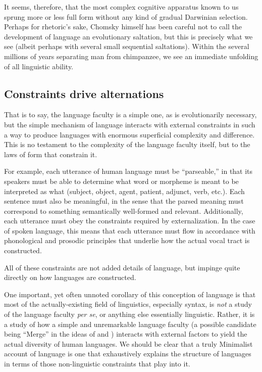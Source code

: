 \documentclass{article}
\begin{document}
It seems, therefore, that the most complex cognitive apparatus known to us sprung more or less full form without any kind of gradual Darwinian selection. Perhaps for rhetoric's sake, Chomsky himself has been careful not to call the development of language an evolutionary saltation, but this is precisely what we see (albeit perhaps with several small sequential saltations). Within the several millions of years separating man from chimpanzee, we see an immediate unfolding of all linguistic ability.

\subsection{Constraints drive alternations}

That is to say, the language faculty is a simple one, as is evolutionarily necessary, but the simple mechanism of language interacts with external constraints in such a way to produce languages with enormous superficial complexity and difference. This is no testament to the complexity of the language faculty itself, but to the laws of form that constrain it.

For example, each utterance of human language must be ``parseable,'' in that its speakers must be able to determine what word or morpheme is meant to be interpreted as what (subject, object, agent, patient, adjunct, verb, etc.). Each sentence must also be meaningful, in the sense that the parsed meaning must correspond to something semantically well-formed and relevant. Additionally, each utterance must obey the constraints required by externalization. In the case of spoken language, this means that each utterance must flow in accordance with phonological and prosodic principles that underlie how the actual vocal tract is constructed.

All of these constraints are not added details of language, but impinge quite directly on how languages are constructed.

One important, yet often unnoted corollary of this conception of language is that most of the actually-existing field of linguistics, especially syntax, is \emph{not} a study of the language faculty \textit{per se}, or anything else essentially linguistic. Rather, it is a study of how a simple and unremarkable language faculty (a possible candidate being ``Merge'' in the ideas of \textcite{hauser02} and \textcite{berwick15}) interacts with external factors to yield the actual diversity of human languages. We should be clear that a truly Minimalist account of language is one that exhaustively explains the structure of languages in terms of those non-linguistic constraints that play into it.
\end{document}
